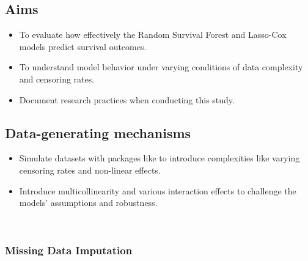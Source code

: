\subsection{Aims}
\begin{itemize} 
\item To evaluate how effectively the Random Survival Forest and Lasso-Cox models predict survival outcomes.
\item To understand model behavior under varying conditions of data complexity and censoring rates.
\item Document research practices when conducting this study.
\end{itemize}

\subsection{Data-generating mechanisms}
\begin{itemize}
\item Simulate datasets with packages like \parencite{davidson-pilon_lifelines_2024} to introduce complexities like varying censoring rates and non-linear effects.
\item Introduce multicollinearity and various interaction effects to challenge the models' assumptions and robustness.
\end{itemize}
\
\subsubsection*{Missing Data Imputation}

